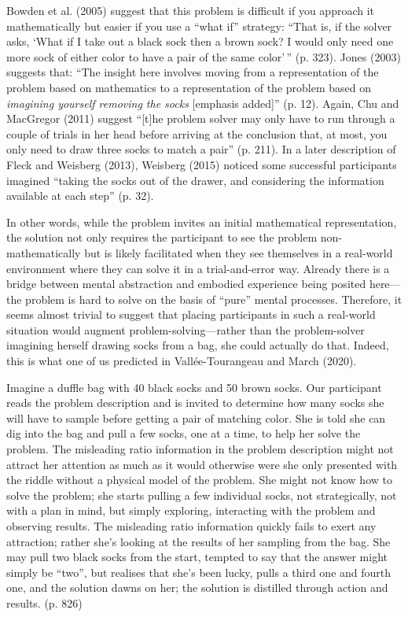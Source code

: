 Bowden et al. (2005) suggest that this problem is difficult if you
approach it mathematically but easier if you use a ``what if'' strategy:
``That is, if the solver asks, `What if I take out a black sock then a
brown sock? I would only need one more sock of either color to have a
pair of the same color'\,'' (p. 323). Jones (2003) suggests that: ``The
insight here involves moving from a representation of the problem based
on mathematics to a representation of the problem based on
\emph{imagining yourself removing the socks} {[}emphasis added{]}'' (p.
12). Again, Chu and MacGregor (2011) suggest ``{[}t{]}he problem solver
may only have to run through a couple of trials in her head before
arriving at the conclusion that, at most, you only need to draw three
socks to match a pair'' (p. 211). In a later description of Fleck and
Weisberg (2013), Weisberg (2015) noticed some successful participants
imagined ``taking the socks out of the drawer, and considering the
information available at each step'' (p. 32).

In other words, while the problem invites an initial mathematical
representation, the solution not only requires the participant to see
the problem non-mathematically but is likely facilitated when they see
themselves in a real-world environment where they can solve it in a
trial-and-error way. Already there is a bridge between mental
abstraction and embodied experience being posited here---the problem is
hard to solve on the basis of ``pure'' mental processes. Therefore, it
seems almost trivial to suggest that placing participants in such a
real-world situation would augment problem-solving---rather than the
problem-solver imagining herself drawing socks from a bag, she could
actually do that. Indeed, this is what one of us predicted in
Vallée-Tourangeau and March (2020).

Imagine a duffle bag with 40 black socks and 50 brown socks. Our
participant reads the problem description and is invited to determine
how many socks she will have to sample before getting a pair of matching
color. She is told she can dig into the bag and pull a few socks, one at
a time, to help her solve the problem. The misleading ratio information
in the problem description might not attract her attention as much as it
would otherwise were she only presented with the riddle without a
physical model of the problem. She might not know how to solve the
problem; she starts pulling a few individual socks, not strategically,
not with a plan in mind, but simply exploring, interacting with the
problem and observing results. The misleading ratio information quickly
fails to exert any attraction; rather she's looking at the results of
her sampling from the bag. She may pull two black socks from the start,
tempted to say that the answer might simply be ``two'', but realises
that she's been lucky, pulls a third one and fourth one, and the
solution dawns on her; the solution is distilled through action and
results. (p. 826)

